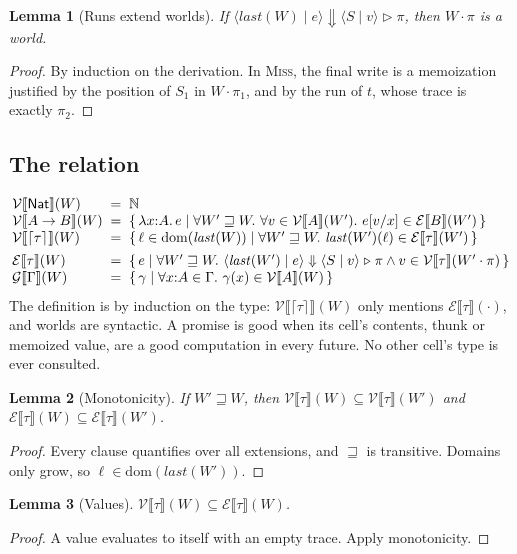 \documentclass[11pt]{article}
\newtheorem*{lemma}{Lemma}
\newcommand{\Nat}{\mathsf{Nat}}
\newcommand{\lam}[2]{\lambda #1{:}#2.\,}
\newcommand{\Prom}[2]{\lceil #2 \rceil^{#1}}
\newcommand{\rn}[1]{\textsc{#1}}
\newcommand{\Vrel}[2]{\mathcal{V}\llbracket #1 \rrbracket(#2)}
\newcommand{\Erel}[2]{\mathcal{E}\llbracket #1 \rrbracket(#2)}
\newcommand{\Grel}[2]{\mathcal{G}\llbracket #1 \rrbracket(#2)}
\newcommand{\last}[1]{\mathit{last}(#1)}
\newcommand{\ext}{\sqsupseteq}
\newcommand{\cfg}[2]{\langle #1 \mid #2 \rangle}
\newcommand{\evals}[5]{\cfg{#1}{#2} \Downarrow \cfg{#3}{#4} \mathrel{\triangleright} #5}
\begin{document}
\begin{lemma}[Runs extend worlds]
  If $\evals{\last{W}}{e}{S}{v}{\pi}$, then $W \cdot \pi$ is a world.
\end{lemma}
\begin{proof}
  By induction on the derivation. In \rn{Miss}, the final write is a
  memoization justified by the position of $S_1$ in $W \cdot \pi_1$, and by
  the run of $t$, whose trace is exactly $\pi_2$.
\end{proof}

\subsection{The relation}

\[
\begin{array}{@{}l@{\;\;=\;\;}l@{}}
  \Vrel{\Nat}{W} & \mathbb{N} \\
  \Vrel{A \to B}{W} &
    \{\, \lam{x}{A} e \mid \forall W' \ext W.\ \forall v \in \Vrel{A}{W'}.\
      e[v/x] \in \Erel{B}{W'} \,\} \\
  \Vrel{\Prom{}{\tau}}{W} &
    \{\, \ell \in \mathrm{dom}(\last{W}) \mid \forall W' \ext W.\
      \last{W'}(\ell) \in \Erel{\tau}{W'} \,\} \\[1ex]
  \Erel{\tau}{W} &
    \{\, e \mid \forall W' \ext W.\
      \evals{\last{W'}}{e}{S}{v}{\pi} \wedge v \in \Vrel{\tau}{W' \cdot \pi} \,\} \\
  \Grel{\Gamma}{W} &
    \{\, \gamma \mid \forall x{:}A \in \Gamma.\ \gamma(x) \in \Vrel{A}{W} \,\}
\end{array}
\]
The definition is by induction on the type: $\Vrel{\Prom{}{\tau}}{W}$ only
mentions $\Erel{\tau}{\cdot}$, and worlds are syntactic. A promise is good
when its cell's contents, thunk or memoized value, are a good computation in
every future. No other cell's type is ever consulted.

\begin{lemma}[Monotonicity]
  If $W' \ext W$, then $\Vrel{\tau}{W} \subseteq \Vrel{\tau}{W'}$ and
  $\Erel{\tau}{W} \subseteq \Erel{\tau}{W'}$.
\end{lemma}
\begin{proof}
  Every clause quantifies over all extensions, and $\ext$ is transitive.
  Domains only grow, so $\ell \in \mathrm{dom}(\last{W'})$.
\end{proof}

\begin{lemma}[Values]
  $\Vrel{\tau}{W} \subseteq \Erel{\tau}{W}$.
\end{lemma}
\begin{proof}
  A value evaluates to itself with an empty trace. Apply monotonicity.
\end{proof}
\end{document}
